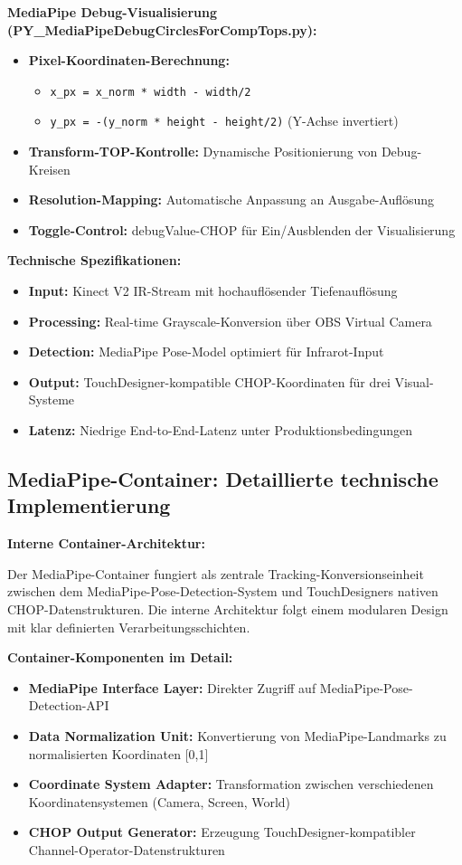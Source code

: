 \textbf{MediaPipe Debug-Visualisierung (PY\_MediaPipeDebugCirclesForCompTops.py):}
\begin{itemize}
    \item \textbf{Pixel-Koordinaten-Berechnung:} 
    \begin{itemize}
        \item \texttt{x\_px = x\_norm * width - width/2}
        \item \texttt{y\_px = -(y\_norm * height - height/2)} (Y-Achse invertiert)
    \end{itemize}
    \item \textbf{Transform-TOP-Kontrolle:} Dynamische Positionierung von Debug-Kreisen
    \item \textbf{Resolution-Mapping:} Automatische Anpassung an Ausgabe-Auflösung
    \item \textbf{Toggle-Control:} debugValue-CHOP für Ein/Ausblenden der Visualisierung
\end{itemize}

\textbf{Technische Spezifikationen:}
\begin{itemize}
    \item \textbf{Input:} Kinect V2 IR-Stream mit hochauflösender Tiefenauflösung
    \item \textbf{Processing:} Real-time Grayscale-Konversion über OBS Virtual Camera
    \item \textbf{Detection:} MediaPipe Pose-Model optimiert für Infrarot-Input
    \item \textbf{Output:} TouchDesigner-kompatible CHOP-Koordinaten für drei Visual-Systeme
    \item \textbf{Latenz:} Niedrige End-to-End-Latenz unter Produktionsbedingungen
\end{itemize}

\subsection{MediaPipe-Container: Detaillierte technische Implementierung}

\textbf{Interne Container-Architektur:}

Der MediaPipe-Container fungiert als zentrale Tracking-Konversionseinheit zwischen dem MediaPipe-Pose-Detection-System und TouchDesigners nativen CHOP-Datenstrukturen. Die interne Architektur folgt einem modularen Design mit klar definierten Verarbeitungsschichten.

\textbf{Container-Komponenten im Detail:}
\begin{itemize}
    \item \textbf{MediaPipe Interface Layer:} Direkter Zugriff auf MediaPipe-Pose-Detection-API
    \item \textbf{Data Normalization Unit:} Konvertierung von MediaPipe-Landmarks zu normalisierten Koordinaten [0,1]
    \item \textbf{Coordinate System Adapter:} Transformation zwischen verschiedenen Koordinatensystemen (Camera, Screen, World)
    \item \textbf{CHOP Output Generator:} Erzeugung TouchDesigner-kompatibler Channel-Operator-Datenstrukturen
\end{itemize}

